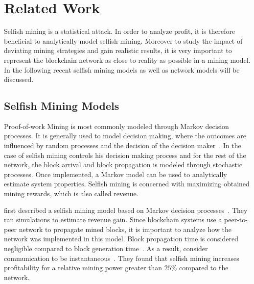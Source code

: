 \chapter{Related Work}\label{chap:relatedwork}
Selfish mining is a statistical attack. In order to analyze profit, it is therefore beneficial to analytically model selfish mining. Moreover to study the impact of deviating mining strategies and gain realistic results, it is very important to represent the blockchain network as close to reality as possible in a mining model. In the following recent selfish mining models as well as network models will be discussed.


\section{Selfish Mining Models}
Proof-of-work Mining is most commonly modeled through Markov decision processes.
It is generally used to model decision making, where the outcomes are influenced by random processes and the decision of the decision maker~\cite{ibe2013markov}.
In the case of selfish mining controls his decision making process and for the rest of the network, the block arrival and block propagation is modeled through stochastic processes. Once implemented, a Markov model can be used to analytically estimate system properties. Selfish mining is concerned with maximizing obtained mining rewards, which is also called revenue.

\citeauthor{eyal} first described a selfish mining model based on Markov decision processes~\cite{eyal}.
They ran simulations to estimate revenue gain. Since blockchain systems use a peer-to-peer network to propagate mined blocks, it is important to analyze how the network was implemented in this model. Block propagation time is considered negligible compared to block generation time~\cite{eyal}. As a result, \citeauthor{eyal} consider communication to be instantaneous~\citep{eyal}. They found that selfish mining increases profitability for a relative mining power greater than $25\%$ compared to the network.

